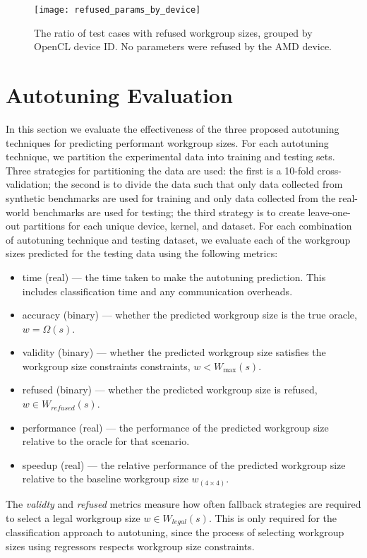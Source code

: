 \begin{figure}
  \centering
  \vspace{-1em}
  \texttt{[image: refused\_params\_by\_device]}
  \vspace{-1em}
  \caption{%
    The ratio of test cases with refused workgroup sizes, grouped by
    OpenCL device ID. No parameters were refused by the AMD device.
    \vspace{-1em}%
  }
\label{fig:refused-params}
\end{figure}


\section{Autotuning Evaluation}

In this section we evaluate the effectiveness of the three proposed
autotuning techniques for predicting performant workgroup sizes. For
each autotuning technique, we partition the experimental data into
training and testing sets. Three strategies for partitioning the data
are used: the first is a 10-fold cross-validation; the second is to
divide the data such that only data collected from synthetic
benchmarks are used for training and only data collected from the
real-world benchmarks are used for testing; the third strategy is to
create leave-one-out partitions for each unique device, kernel, and
dataset. For each combination of autotuning technique and testing
dataset, we evaluate each of the workgroup sizes predicted for the
testing data using the following metrics:
%
\begin{itemize}
\item time (real) --- the time taken to make the autotuning
  prediction. This includes classification time and any communication
  overheads.
\item accuracy (binary) --- whether the predicted workgroup size is
  the true oracle, $w = \Omega(s)$.
\item validity (binary) --- whether the predicted workgroup size
  satisfies the workgroup size constraints constraints,
  $w < W_{\max}(s)$.
\item refused (binary) --- whether the predicted workgroup size is
  refused, $w \in W_{refused}(s)$.
\item performance (real) --- the performance of the predicted
  workgroup size relative to the oracle for that scenario.
\item speedup (real) --- the relative performance of the predicted
  workgroup size relative to the baseline workgroup size
  $w_{(4 \times 4)}$.
\end{itemize}
%
The \emph{validty} and \emph{refused} metrics measure how often
fallback strategies are required to select a legal workgroup size
$w \in W_{legal}(s)$. This is only required for the classification
approach to autotuning, since the process of selecting workgroup sizes
using regressors respects workgroup size constraints.


